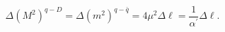 \begin{equation}      
\Delta (M^{2})^{q-D} = \Delta (m^{2})^{q-\bar{q}} = 4 \mu^{2} \Delta \ell = \frac{1}{\alpha^{'}} \Delta \ell .      
\end{equation} 
